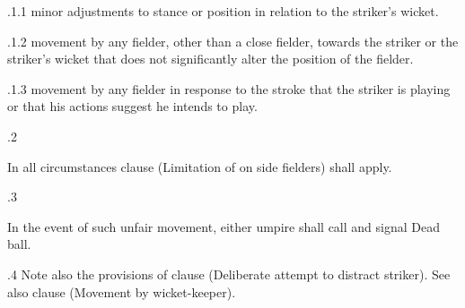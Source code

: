 \documentclass[12pt]{article}
\begin{document}
\vspace{\baselineskip}
\begin{adjustwidth}{0.49in}{0.0in}
{\fontsize{9pt}{10.8pt}.1.1 \tabto{1.17in} minor adjustments to stance or position in relation to the striker’s wicket.\par}\par

\end{adjustwidth}


\vspace{\baselineskip}
\begin{adjustwidth}{1.18in}{0.22in}
{\fontsize{9pt}{10.8pt}.1.2 \tabto{1.17in} movement by any fielder, other than a close fielder, towards the striker or the striker’s wicket that does not significantly alter the position of the fielder.\par}\par

\end{adjustwidth}


\vspace{\baselineskip}
\begin{adjustwidth}{1.18in}{0.15in}
{\fontsize{9pt}{10.8pt}.1.3 \tabto{1.17in} movement by any fielder in response to the stroke that the striker is playing or that his actions suggest he intends to play.\par}\par

\end{adjustwidth}


\vspace{\baselineskip}
{\fontsize{9pt}{10.8pt}.2 \tabto{0.49in} {\fontsize{8pt}{9.6pt}\selectfont In all circumstances clause (Limitation of on side fielders) shall apply.\par}\par}\par


\vspace{\baselineskip}
{\fontsize{9pt}{10.8pt}.3 \tabto{0.49in} {\fontsize{8pt}{9.6pt}\selectfont In the event of such unfair movement, either umpire shall call and signal Dead ball.\par}\par}\par


\vspace{\baselineskip}
\begin{adjustwidth}{0.5in}{0.53in}
{\fontsize{9pt}{10.8pt}.4 \tabto{0.49in} Note also the provisions of clause (Deliberate attempt to distract striker). See also clause  (Movement by wicket-keeper).\par}\par

\end{adjustwidth}
\end{document}

